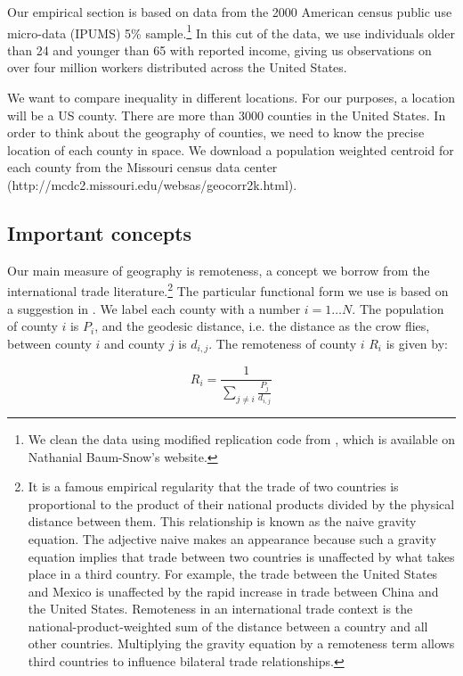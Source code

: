 \documentclass[12 pt]{article}
\begin{document}
Our empirical section is based on data from the 2000 American census public use micro-data (IPUMS) 5\% sample.\footnote{We clean the data using modified replication code from \citet{baum2013inequality}, which is available on Nathanial Baum-Snow's website.}  In this cut of the data, we use individuals older than 24 and younger than 65 with reported income, giving us observations on over four million workers distributed across the United States.

We want to compare inequality in different locations.  For our purposes, a location will be a US county.  There are more than 3000 counties in the United States.  In order to think about the geography of counties, we need to know the precise location of each county in space.  We download a population weighted centroid for each county from the Missouri census data center (http://mcdc2.missouri.edu/websas/geocorr2k.html).


\subsection{Important concepts}

Our main measure of geography is remoteness, a concept we borrow from the international trade literature.\footnote{It is a famous empirical regularity that the trade of two countries is proportional to the product of their national products divided by the physical distance between them.  This relationship is known as the naive gravity equation.  The adjective naive makes an appearance because such a gravity equation implies that trade between two countries is unaffected by what takes place in a third country.  For example, the trade between the United States and Mexico is unaffected by the rapid increase in trade between China and the United States.  Remoteness in an international trade context is the national-product-weighted sum of the distance between a country and all other countries.  Multiplying the gravity equation by a remoteness term allows third countries to influence bilateral trade relationships.}  The particular functional form we use is based on a suggestion in \citet{head2003gravity}.  We label each county with a number $i=1\dots N$.  The population of county $i$ is $P_i$, and the geodesic distance, i.e. the distance as the crow flies, between county $i$ and county $j$ is $d_{i,j}$.  The remoteness of county $i$ $R_i$ is given by:

\begin{equation}
    R_i = \frac{1}{\sum_{j\neq i} \frac{P_j}{d_{i,j}}} \nonumber
    \label{eq:rem}
\end{equation}
\end{document}
